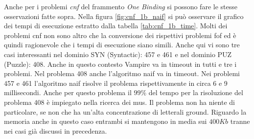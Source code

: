 \documentclass[./main.tex]{subfiles}
\begin{document}


Anche per i problemi \textit{cnf} del frammento \textit{One Binding} si possono fare le stesse osservazioni fatte sopra.
Nella figura \ref{fig:cnf_1b_naif} si può osservare il grafico dei tempi di esecuzione estratto dalla tabella \ref{tab:cnf_1b_time}.
Molti dei problemi cnf non sono altro che la conversione dei rispettivi problemi fof ed è quindi ragionevole
che i tempi di esecuzione siano simili.
Anche qui vi sono tre casi interessanti nel dominio SYN (Syntactic): 457 e 461 e 
nel dominio PUZ (Puzzle): 408.
Anche in questo contesto Vampire va in timeout in tutti e tre i problemi.
Nel problema 408 anche l'algoritmo naif va in timeout.
Nei problemi 457 e 461 l'algoritmo naif risolve il problema rispettivamente in circa 6 e 9 millisecondi.
Anche per questo problema il $99\%$ del tempo per la risoluzione del problema 408 è impiegato nella ricerca dei mus.
Il problema non ha niente di particolare, se non che ha un'alta concentrazione di letterali ground.
Riguardo la memoria anche in questo caso entrambi si mantengono in media sui $400Kb$ tranne nei casi già discussi in precedenza.



\end{document}
